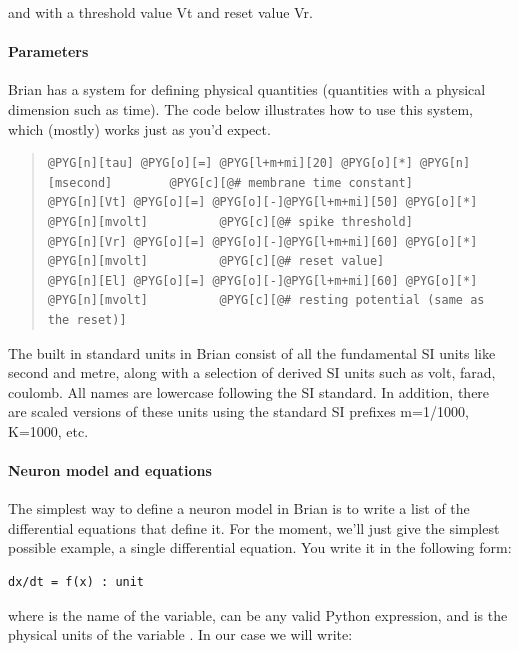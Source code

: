 \documentclass[letterpaper,10pt,english]{manual}
\begin{document}
and with a threshold value Vt and reset value Vr.


\paragraph{Parameters}

Brian has a system for defining physical quantities (quantities with
a physical dimension such as time). The code below illustrates how
to use this system, which (mostly) works just as you'd expect.
\begin{quote}

\begin{Verbatim}[commandchars=@\[\]]
@PYG[n][tau] @PYG[o][=] @PYG[l+m+mi][20] @PYG[o][*] @PYG[n][msecond]        @PYG[c][@# membrane time constant]
@PYG[n][Vt] @PYG[o][=] @PYG[o][-]@PYG[l+m+mi][50] @PYG[o][*] @PYG[n][mvolt]          @PYG[c][@# spike threshold]
@PYG[n][Vr] @PYG[o][=] @PYG[o][-]@PYG[l+m+mi][60] @PYG[o][*] @PYG[n][mvolt]          @PYG[c][@# reset value]
@PYG[n][El] @PYG[o][=] @PYG[o][-]@PYG[l+m+mi][60] @PYG[o][*] @PYG[n][mvolt]          @PYG[c][@# resting potential (same as the reset)]
\end{Verbatim}
\end{quote}

The built in standard units in Brian consist of all the fundamental
SI units like second and metre, along with a selection of derived
SI units such as volt, farad, coulomb. All names are lowercase
following the SI standard. In addition, there are scaled versions
of these units using the standard SI prefixes m=1/1000, K=1000, etc.


\paragraph{Neuron model and equations}

The simplest way to define a neuron model in Brian is to write a list
of the differential equations that define it. For the moment, we'll just
give the simplest possible example, a single differential equation. You
write it in the following form:

\begin{Verbatim}[commandchars=@\[\]]
dx/dt = f(x) : unit
\end{Verbatim}

where  is the name of the variable,  can be any valid Python
expression, and  is the physical units of the variable . In our
case we will write:
\end{document}
